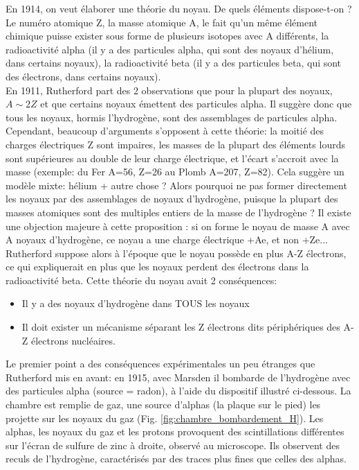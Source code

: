 En 1914, on veut élaborer une théorie du noyau. De quels éléments dispose-t-on ? Le numéro atomique Z, la masse atomique A, le fait qu'un même élément chimique puisse exister sous forme de plusieurs isotopes avec A différents, la radioactivité alpha (il y a des particules alpha, qui sont des noyaux d'hélium, dans certains noyaux), la radioactivité beta (il y a des particules beta, qui sont des électrons, dans certains noyaux). \\
En 1911, Rutherford part des 2 observations que pour la plupart des noyaux, $A \sim 2Z$ et que certains noyaux émettent des particules alpha. Il suggère donc que tous les noyaux, hormis l'hydrogène, sont des assemblages de particules alpha. \\
Cependant, beaucoup d'arguments s'opposent à cette théorie: la moitié des charges électriques Z sont impaires, les masses de la plupart des éléments lourds sont supérieures au double de leur charge électrique, et l'écart s'accroit avec la masse (exemple: du Fer A=56, Z=26 au Plomb A=207, Z=82).  Cela suggère un modèle mixte: hélium + autre chose ? Alors pourquoi ne pas former directement les noyaux par des assemblages de noyaux d'hydrogène, puisque la plupart des masses atomiques sont des multiples entiers de la masse de l'hydrogène ? Il existe une objection majeure à cette proposition : si on forme le noyau de masse A avec A noyaux d'hydrogène, ce noyau a une charge électrique +Ae, et non +Ze... Rutherford suppose alors à l'époque que le noyau possède en plus A-Z électrons, ce qui expliquerait en plus que les noyaux perdent des électrons dans la radioactivité beta. Cette théorie du noyau avait 2 conséquences:

\begin{itemize}
    \item Il y a des noyaux d'hydrogène dans TOUS les noyaux
    \item Il doit exister un mécanisme séparant les Z électrons dits périphériques des A-Z électrons nucléaires.
\end{itemize}

Le premier point a des conséquences expérimentales un peu étranges que Rutherford mis en avant: en 1915, avec Marsden il bombarde de l'hydrogène avec des particules alpha (source = radon), à l'aide du dispositif illustré ci-dessous. La chambre est remplie de gaz, une source d’alphas (la plaque sur le pied) les projette sur les noyaux du gaz (Fig. \ref{fig:chambre_bombardement_H}). Les alphas, les noyaux du gaz et les protons  provoquent des scintillations différentes sur l’écran de sulfure de zinc à droite, observé au microscope. Ils observent des reculs de l'hydrogène, caractérisés par des traces plus fines que celles des alphas.

